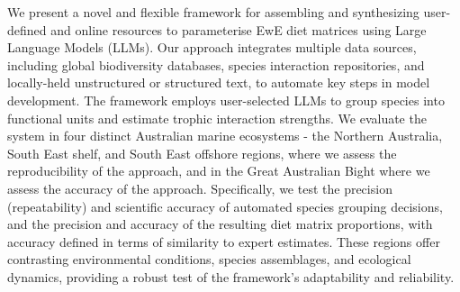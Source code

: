 We present a novel and flexible framework for assembling and synthesizing user-defined and online resources to parameterise EwE diet matrices using Large Language Models (LLMs). Our approach integrates multiple data sources, including global biodiversity databases, species interaction repositories, and locally-held unstructured or structured text, to automate key steps in model development. The framework employs user-selected LLMs to group species into functional units and estimate trophic interaction strengths. We evaluate the system in four distinct Australian marine ecosystems - the Northern Australia, South East shelf, and South East offshore regions, where we assess the reproducibility of the approach, and in the Great Australian Bight where we assess the accuracy of the approach. Specifically, we test the precision (repeatability) and scientific accuracy of automated species grouping decisions, and the precision and accuracy of the resulting diet matrix proportions, with accuracy defined in terms of similarity to expert estimates. These regions offer contrasting environmental conditions, species assemblages, and ecological dynamics, providing a robust test of the framework's adaptability and reliability.


